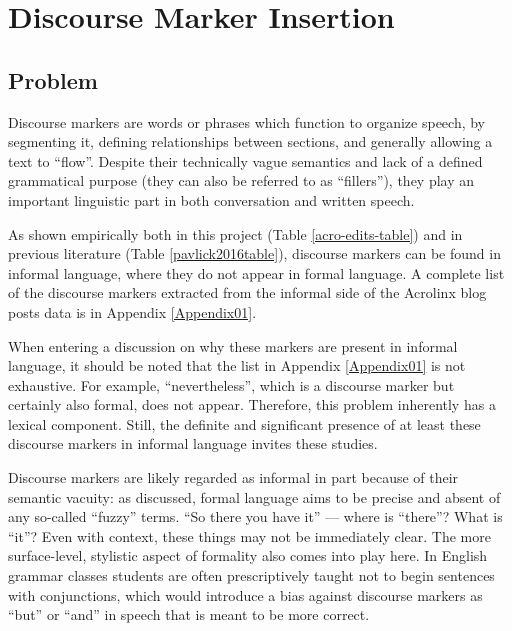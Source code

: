 \chapter{Discourse Marker Insertion}

\label{Chapter05}

\section{Problem}

Discourse markers are words or phrases which function to organize speech, by segmenting it, defining relationships between sections, and generally allowing a text to ``flow''. Despite their technically vague semantics and lack of a defined grammatical purpose (they can also be referred to as ``fillers''), they play an important linguistic part in both conversation and written speech.

As shown empirically both in this project (Table \ref{acro-edits-table}) and in previous literature (Table \ref{pavlick2016table}), discourse markers can be found in informal language, where they do not appear in formal language. A complete list of the discourse markers extracted from the informal side of the Acrolinx blog posts data is in Appendix \ref{Appendix01}. 

When entering a discussion on why these markers are present in informal language, it should be noted that the list in Appendix \ref{Appendix01} is not exhaustive. For example, ``nevertheless'', which is a discourse marker but certainly also formal, does not appear. Therefore, this problem inherently has a lexical component. Still, the definite and significant presence of at least these discourse markers in informal language invites these studies.

Discourse markers are likely regarded as informal in part because of their semantic vacuity: as discussed, formal language aims to be precise and absent of any so-called ``fuzzy'' terms. ``So there you have it'' --- where is ``there''? What is ``it''? Even with context, these things may not be immediately clear. The more surface-level, stylistic aspect of formality also comes into play here. In English grammar classes students are often prescriptively taught not to begin sentences with conjunctions, which would introduce a bias against discourse markers as ``but'' or ``and'' in speech that is meant to be more correct.

